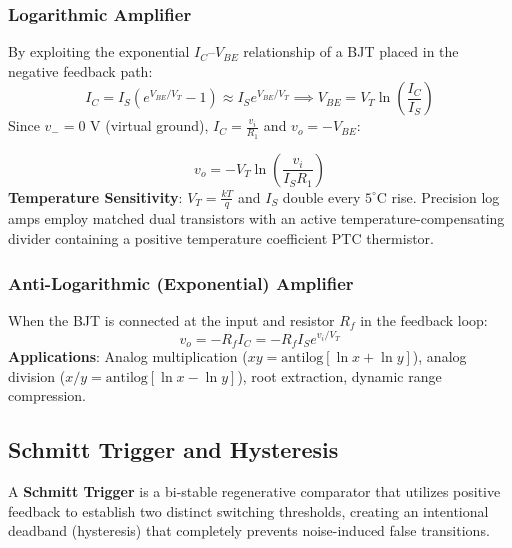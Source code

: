 \documentclass[12pt,a4paper]{article}
\begin{document}
\subsubsection{Logarithmic Amplifier}
By exploiting the exponential $I_C\text{--}V_{BE}$ relationship of a BJT placed in the negative feedback path:
\begin{equation}
  I_{C} = I_S \left(e^{V_{BE}/V_T} - 1\right) \approx I_S e^{V_{BE}/V_T} \implies V_{BE} = V_T \ln\left(\frac{I_C}{I_S}\right)
\end{equation}
Since $v_- = 0\text{ V}$ (virtual ground), $I_C = \frac{v_i}{R_1}$ and $v_o = -V_{BE}$:
\begin{tcolorbox}[formulabox, title={Logarithmic Amplifier Output}]
\begin{equation}
  v_o = -V_T \ln\left(\frac{v_i}{I_S R_1}\right)
\end{equation}
\textbf{Temperature Sensitivity}: $V_T = \frac{kT}{q}$ and $I_S$ double every $5^\circ\text{C}$ rise. Precision log amps employ matched dual transistors with an active temperature-compensating divider containing a positive temperature coefficient PTC thermistor.
\end{tcolorbox}

\subsubsection{Anti-Logarithmic (Exponential) Amplifier}
When the BJT is connected at the input and resistor $R_f$ in the feedback loop:
\begin{equation}
  v_o = -R_f I_C = -R_f I_S e^{v_i/V_T}
\end{equation}
\textbf{Applications}: Analog multiplication ($xy = \text{antilog}[\ln x + \ln y]$), analog division ($x/y = \text{antilog}[\ln x - \ln y]$), root extraction, dynamic range compression.

\subsection{Schmitt Trigger and Hysteresis}
\begin{tcolorbox}[defbox, title={Schmitt Trigger}]
A \textbf{Schmitt Trigger} is a bi-stable regenerative comparator that utilizes positive feedback to establish two distinct switching thresholds, creating an intentional deadband (hysteresis) that completely prevents noise-induced false transitions.
\end{tcolorbox}
\end{document}
